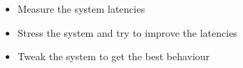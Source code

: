 {
  \begin{itemize}
    \item Measure the system latencies
    \item Stress the system and try to improve the latencies
    \item Tweak the system to get the best behaviour
  \end{itemize}
}
